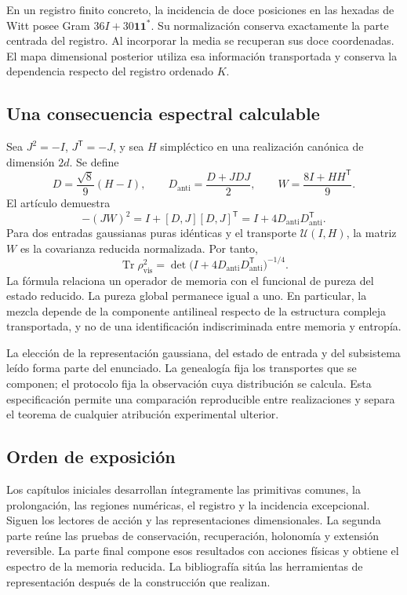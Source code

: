 En un registro finito concreto, la incidencia de doce posiciones en las hexadas de Witt posee Gram
\(36I+30\mathbf1\mathbf1^*\). Su normalización conserva exactamente la parte centrada del registro. Al incorporar la media se recuperan sus doce coordenadas. El mapa dimensional posterior utiliza esa información transportada y conserva la dependencia respecto del registro ordenado \(K\).

\subsection{Una consecuencia espectral calculable}
Sea \(J^2=-I\), \(J^{\mathsf T}=-J\), y sea \(H\) simpléctico en una realización canónica de dimensión \(2d\). Se define
\[
D=\frac{\sqrt8}{9}(H-I),\qquad
D_{\mathrm{anti}}=\frac{D+JDJ}{2},\qquad
W=\frac{8I+HH^{\mathsf T}}9.
\]
El artículo demuestra
\begin{equation}
\boxed{-(JW)^2=I+[D,J][D,J]^{\mathsf T}
=I+4D_{\mathrm{anti}}D_{\mathrm{anti}}^{\mathsf T}.}
\label{nuclear:eq:espectro}
\end{equation}
Para dos entradas gaussianas puras idénticas y el transporte \(\mathcal U(I,H)\), la matriz \(W\) es la covarianza reducida normalizada. Por tanto,
\[
\operatorname{Tr}\rho_{\mathrm{vis}}^2
=\det\bigl(I+4D_{\mathrm{anti}}D_{\mathrm{anti}}^{\mathsf T}\bigr)^{-1/4}.
\]
La fórmula relaciona un operador de memoria con el funcional de pureza del estado reducido. La pureza global permanece igual a uno. En particular, la mezcla depende de la componente antilineal respecto de la estructura compleja transportada, y no de una identificación indiscriminada entre memoria y entropía.

La elección de la representación gaussiana, del estado de entrada y del subsistema leído forma parte del enunciado. La genealogía fija los transportes que se componen; el protocolo fija la observación cuya distribución se calcula. Esta especificación permite una comparación reproducible entre realizaciones y separa el teorema de cualquier atribución experimental ulterior.

\subsection{Orden de exposición}
Los capítulos iniciales desarrollan íntegramente las primitivas comunes, la prolongación, las regiones numéricas, el registro y la incidencia excepcional. Siguen los lectores de acción y las representaciones dimensionales. La segunda parte reúne las pruebas de conservación, recuperación, holonomía y extensión reversible. La parte final compone esos resultados con acciones físicas y obtiene el espectro de la memoria reducida. La bibliografía sitúa las herramientas de representación después de la construcción que realizan.

